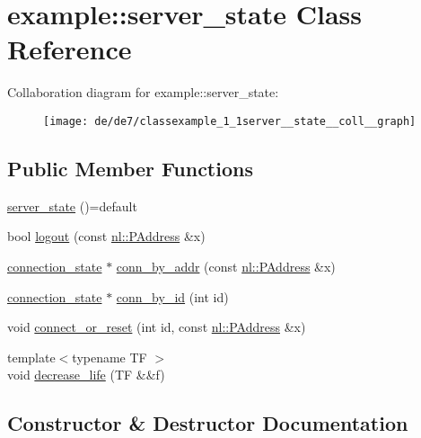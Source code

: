 \hypertarget{classexample_1_1server__state}{}\section{example\+:\+:server\+\_\+state Class Reference}
\label{classexample_1_1server__state}


Collaboration diagram for example\+:\+:server\+\_\+state\+:
\nopagebreak
\begin{figure}[H]
\begin{center}
\leavevmode
\texttt{[image: de/de7/classexample\_1\_1server\_\_state\_\_coll\_\_graph]}
\end{center}
\end{figure}
\subsection*{Public Member Functions}
\begin{DoxyCompactItemize}
\item 
\hyperlink{classexample_1_1server__state_a4944de09277fd8f8153796cc3f6af8bb}{server\+\_\+state} ()=default
\item 
bool \hyperlink{classexample_1_1server__state_a143802493be3fab58d9b021949a268a3}{logout} (const \hyperlink{structnl_1_1PAddress}{nl\+::\+P\+Address} \&x)
\item 
\hyperlink{classexample_1_1connection__state}{connection\+\_\+state} $\ast$ \hyperlink{classexample_1_1server__state_af608eb02609e229d0e750b7e04432821}{conn\+\_\+by\+\_\+addr} (const \hyperlink{structnl_1_1PAddress}{nl\+::\+P\+Address} \&x)
\item 
\hyperlink{classexample_1_1connection__state}{connection\+\_\+state} $\ast$ \hyperlink{classexample_1_1server__state_a2ddcf829df5e8bdc8686d8982cefa8af}{conn\+\_\+by\+\_\+id} (int id)
\item 
void \hyperlink{classexample_1_1server__state_a65913ae9492758a1452a13c8a6fac4e8}{connect\+\_\+or\+\_\+reset} (int id, const \hyperlink{structnl_1_1PAddress}{nl\+::\+P\+Address} \&x)
\item 
{\footnotesize template$<$typename T\+F $>$ }\\void \hyperlink{classexample_1_1server__state_adbe03db51f7d3275f9620b2bccf3589e}{decrease\+\_\+life} (T\+F \&\&f)
\end{DoxyCompactItemize}


\subsection{Constructor \& Destructor Documentation}
\hypertarget{classexample_1_1server__state_a4944de09277fd8f8153796cc3f6af8bb}{}
